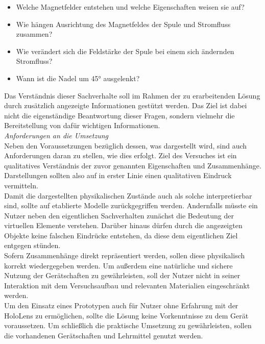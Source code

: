 \begin{itemize}
	\setlength{\itemsep}{-3pt}
	\item Welche Magnetfelder entstehen und welche Eigenschaften weisen sie auf?
	\item Wie hängen Ausrichtung des Magnetfeldes der Spule und Stromfluss zusammen?
	\item Wie verändert sich die Feldstärke der Spule bei einem sich ändernden Stromfluss?
	\item Wann ist die Nadel um 45° ausgelenkt?
\end{itemize}

Das Verständnis dieser Sachverhalte soll im Rahmen der zu erarbeitenden Lösung durch zusätzlich angezeigte Informationen gestützt werden. Das Ziel ist dabei nicht die eigenständige Beantwortung dieser Fragen, sondern vielmehr die Bereitstellung von dafür wichtigen Informationen.\\

\textit{Anforderungen an die Umsetzung}\\
Neben den Voraussetzungen bezüglich dessen, was dargestellt wird, sind auch Anforderungen daran zu stellen, wie dies erfolgt. Ziel des Versuches ist ein qualitatives Verständnis der zuvor genannten Eigenschaften und Zusammenhänge. Darstellungen sollten also auf in erster Linie einen qualitativen Eindruck vermitteln.\\

Damit die dargestellten physikalischen Zustände auch als solche interpretierbar sind, sollte auf etablierte Modelle zurückgegriffen werden. Andernfalls müsste ein Nutzer neben den eigentlichen Sachverhalten zunächst die Bedeutung der virtuellen Elemente verstehen. Darüber hinaus dürfen durch die angezeigten Objekte keine falschen Eindrücke entstehen, da diese dem eigentlichen Ziel entgegen stünden.\\
\noindent\hspace*{5mm}
Sofern Zusammenhänge direkt repräsentiert werden, sollen diese physikalisch korrekt wiedergegeben werden. Um außerdem eine natürliche und sichere Nutzung der Gerätschaften zu gewährleisten, soll der Nutzer nicht in seiner Interaktion mit dem Versuchsaufbau und relevanten Materialien eingeschränkt werden.\\
\noindent\hspace*{5mm}
Um den Einsatz eines Prototypen auch für Nutzer ohne Erfahrung mit der HoloLens zu ermöglichen, sollte die Lösung keine Vorkenntnisse zu dem Gerät voraussetzen. Um schließlich die praktische Umsetzung zu gewährleisten, sollen die vorhandenen Gerätschaften und Lehrmittel genutzt werden.\\


